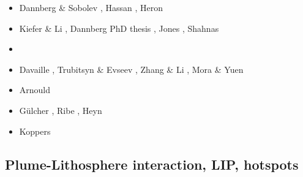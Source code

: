 \begin{scriptsize}
\begin{itemize}
\item[\twothousandfifteen] Dannberg \& Sobolev \cite{daso15}, Hassan \etal \cite{hafg15}, 
                           Heron \etal \cite{hels15}
\item[\twothousandsixteen] Kiefer \& Li \cite{kili16}, Dannberg PhD thesis \cite{dannbergphd}, 
                           Jones \etal \cite{jodc16}, Shahnas \etal \cite{shpy16}
\item[\twothousandseventeen] \cite{moyu17}\cite{lizh17}
\item[\twothousandeighteen] Davaille \etal \cite{dacc18}, Trubitsyn \& Evseev \cite{trev18}, 
                            Zhang \& Li \cite{zhli18}, Mora \& Yuen \cite{moyu18}
\item[\twothousandnineteen] Arnould \etal \cite{argc19}
\item[\twothousandtwenty] G{\"u}lcher \etal \cite{gugm20}, Ribe \etal \cite{rits20},
                          Heyn \etal \cite{hect20b}
\item[\twothousandtwentyone] Koppers \etal \cite{kobj21}
\end{itemize}
\end{scriptsize}

\subsection{Plume-Lithosphere interaction, LIP, hotspots}

